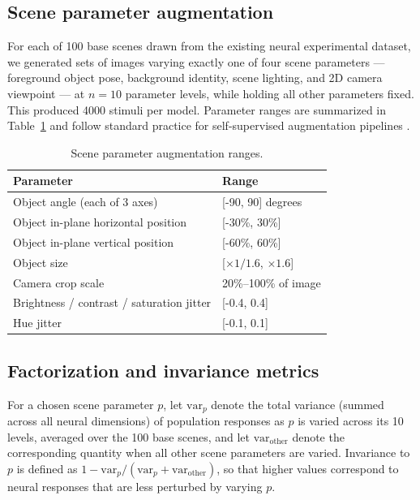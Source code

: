 \documentclass[11pt]{article}
\begin{document}
\subsection{Scene parameter augmentation}

For each of 100 base scenes drawn from the existing neural experimental
dataset, we generated sets of images varying exactly one of four scene
parameters --- foreground object pose, background identity, scene lighting,
and 2D camera viewpoint --- at \(n=10\) parameter levels, while holding all
other parameters fixed. This produced 4000 stimuli per model. Parameter
ranges are summarized in Table~\ref{tab:augparams} and follow standard
practice for self-supervised augmentation pipelines
\citep{chen2020simple, he2020momentum}.

\begin{table}[htbp]
\centering
\caption{Scene parameter augmentation ranges.}
\label{tab:augparams}
\begin{tabular}{ll}
\toprule
Parameter & Range \\
\midrule
Object angle (each of 3 axes) & [-90, 90] degrees \\
Object in-plane horizontal position & [-30\%, 30\%] \\
Object in-plane vertical position & [-60\%, 60\%] \\
Object size & [$\times 1/1.6$, $\times 1.6$] \\
Camera crop scale & 20\%--100\% of image \\
Brightness / contrast / saturation jitter & [-0.4, 0.4] \\
Hue jitter & [-0.1, 0.1] \\
\bottomrule
\end{tabular}
\end{table}

\subsection{Factorization and invariance metrics}

For a chosen scene parameter \(p\), let \(\mathrm{var}_{p}\) denote the
total variance (summed across all neural dimensions) of population responses
as \(p\) is varied across its 10 levels, averaged over the 100 base scenes,
and let \(\mathrm{var}_{\mathrm{other}}\) denote the corresponding quantity
when all other scene parameters are varied. Invariance to \(p\) is defined
as \(1 - \mathrm{var}_{p}/(\mathrm{var}_{p}+\mathrm{var}_{\mathrm{other}})\),
so that higher values correspond to neural responses that are less perturbed
by varying \(p\).
\end{document}
